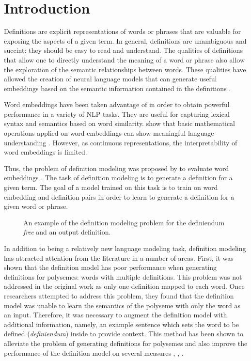 \section{Introduction}
Definitions are explicit representations of words or phrases that are valuable
for exposing the aspects of a given term. In general, definitions are
unambiguous and succint: they should be easy to read and understand. The
qualities of definitions that allow one to directly understand the meaning of a
word or phrase also allow the exploration of the semantic relationships between
words. These qualities have allowed the creation of neural language models that
can generate useful embeddings based on the semantic information contained in
the definitions \citeauthor{hill_learning_2016, bosc_auto_2018}.

Word embeddings have been taken advantage of in order to obtain powerful
performance in a variety of NLP tasks. They are useful for capturing lexical
syntax and semantics based on word similarity.
\citeauthor{mikolov_distributed_2013} show that basic mathematical operations
applied on word embeddings can show meaningful language understanding
\citeauthor{mikolov_distributed_2013}. However, as continuous representations, the
interpretability of word embeddings is limited.

Thus, the problem of definition modeling was proposed by
\citeauthor{noraset_definition_2016} to evaluate word embeddings
\citeauthor{noraset_definition_2016}. The task of definition modeling is to generate a
definition for a given term. The goal of a model trained on this task is to
train on word embedding and definition pairs in order to learn to generate a
definition for a given word or phrase.

\begin{figure}
    \centering
    
    \caption{An example of the definition modeling problem for the definiendum
        \textit{free} and an output definition.}
\end{figure}

In addition to being a relatively new language modeling task, definition
modeling has attracted attention from the literature in a number of areas.
First, it was shown that the definition model has poor performance when
generating definitions for polysemes: words with multiple definitions. This
problem was not addressed in the original work as only one definition mapped to
each word. Once researchers attempted to address this problem, they found that
the definition model was unable to learn the semantics of the polyseme with only
the word as an input. Therefore, it was necessary to augment the definition
model with additional information, namely, an example sentence which sets the
word to be defined (\textit{definiendum}) inside to provide context. This method
has been shown to alleviate the problem of generating definitions for polysemes
and also improve the performance of the definition model on several measures
\cite{gadetsky_conditional_2018}, \cite{mickus_mark_2019},
\cite{bevilacqua_generationary_2020}.

